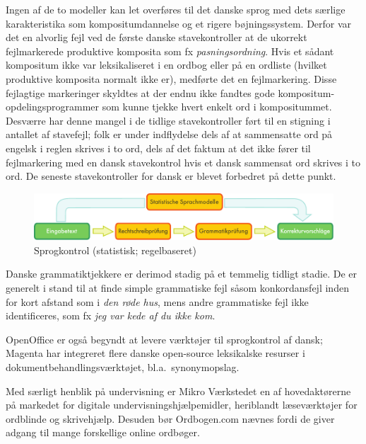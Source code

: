 \documentclass[]{../../metanetpaper}
\begin{document}
\begin{multicols}{2}
Ingen af de to modeller kan let overf\o res til det danske sprog med dets s\ae rlige karakteristika som kompositumdannelse og et rigere b\o jningssystem. Derfor var det en alvorlig fejl ved de f\o rste danske stavekontroller at de ukorrekt fejlmarkerede produktive komposita som fx {\it pasningsordning}. Hvis et s\aa dant kompositum ikke var leksikaliseret i en ordbog eller \mbox{p\aa} en ordliste (hvilket produktive komposita normalt ikke er), medf\o rte det en fejlmarkering. Disse fejlagtige markeringer skyldtes at der endnu ikke fandtes gode kompositum-opdelingsprogrammer som kunne tjekke hvert enkelt ord i kompositummet. Desv\ae rre har denne mangel i de tidlige stavekontroller f\o rt til en stigning i antallet af stavefejl; folk er under indflydelse dels af at sammensatte ord \mbox{p\aa} engelsk i reglen skrives i to ord, dels af det faktum at det ikke f\o rer til fejlmarkering med en dansk stavekontrol hvis et dansk sammensat ord skrives i to ord.  De seneste stavekontroller for dansk er blevet forbedret \mbox{p\aa} dette punkt.

\begin{figure}[htb]
  \center
  \includegraphics[width=\textwidth]{../_media/german/language_checking}
  \caption{Sprogkontrol (statistisk; regelbaseret)}
  \label{fig:langcheckingaarch_de}
\end{figure}

Danske grammatiktjekkere er derimod stadig \mbox{p\aa} et temmelig tidligt stadie. De er generelt i stand til at finde simple grammatiske fejl s\aa som konkordansfejl inden for kort afstand som i {\it *den r\o de hus}, mens andre grammatiske fejl ikke identificeres, som fx {\it *jeg var kede af du ikke kom}.

OpenOffice er \mbox{ogs\aa} begyndt at levere v\ae rkt\o jer til sprogkontrol af dansk; Magenta  har integreret flere danske open-source leksikalske resurser i dokumentbehandlingsv\ae rkt\o jet, bl.a.\ synonymopslag.

Med s\ae rligt henblik \mbox{p\aa} undervisning er Mikro V\ae rkstedet en af hovedakt\o rerne \mbox{p\aa} markedet for digitale undervisningshj\ae lpemidler, heriblandt l\ae sev\ae rkt\o jer for ordblinde og skrivehj\ae lp. Desuden b\o r Ordbogen.com n\ae vnes fordi de giver adgang til mange forskellige online ordb\o ger. 


\end{multicols}
\end{document}
